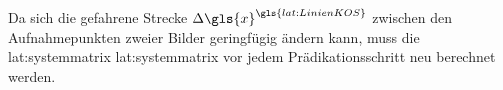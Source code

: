 Da sich die gefahrene Strecke \begin{math} \scl{\Delta\gls{x}}^{\gls{lat:LinienKOS}} \end{math} zwischen den Aufnahmepunkten zweier Bilder geringfügig ändern kann, muss die \glsdesc{lat:systemmatrix} \gls{lat:systemmatrix} vor jedem Prädikationsschritt neu berechnet werden.


